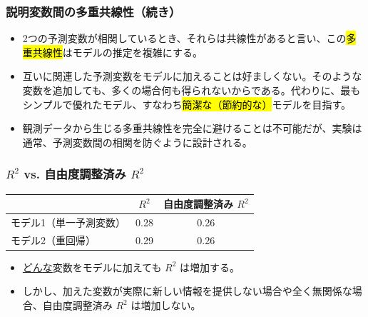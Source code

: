\begin{frame}
\frametitle{説明変数間の多重共線性（続き）}

\begin{itemize}

\item 2つの予測変数が相関しているとき、それらは共線性があると言い、この\hl{多重共線性}はモデルの推定を複雑にする。\\

\item 互いに関連した予測変数をモデルに加えることは好ましくない。そのような変数を追加しても、多くの場合何も得られないからである。代わりに、最もシンプルで優れたモデル、すなわち\hl{簡潔な（節約的な）}モデルを目指す。

\item 観測データから生じる多重共線性を完全に避けることは不可能だが、実験は通常、予測変数間の相関を防ぐように設計される。

\end{itemize}

\end{frame}


\begin{frame}[fragile]
\frametitle{$R^2$ vs. 自由度調整済み $R^2$}

\renewcommand\arraystretch{1.25}
\begin{center}
\begin{tabular}{l | c  c}
			& $R^2$	& 自由度調整済み $R^2$ \\
\hline
モデル1（単一予測変数）	& 0.28	& 0.26 \\
モデル2（重回帰）			& 0.29	& 0.26
\end{tabular}
\end{center}

\begin{itemize}

\item \underline{どんな}変数をモデルに加えても $R^2$ は増加する。

\item しかし、加えた変数が実際に新しい情報を提供しない場合や全く無関係な場合、自由度調整済み $R^2$ は増加しない。

\end{itemize}



\end{frame}

